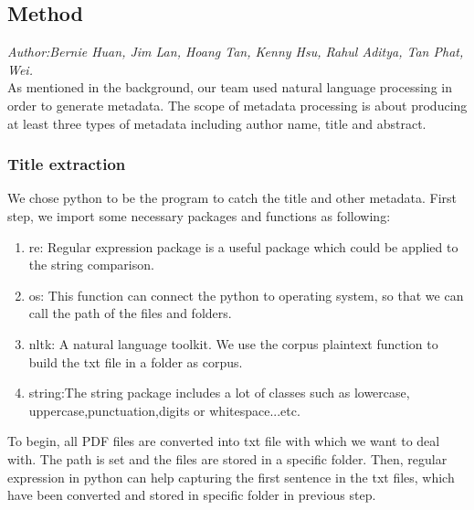 \subsection{Method} %
\textit{\footnotesize Author:Bernie Huan, Jim Lan, Hoang Tan, Kenny Hsu, Rahul Aditya, Tan Phat, Wei.}\\

As mentioned in the background, our team used natural language processing in order to generate metadata. 
The scope of metadata processing is about producing at least three types of metadata including author name, title and abstract.


\subsubsection{Title extraction}

We chose python to be the program to catch the title and other metadata.
First step, we import some necessary packages and functions as following:

\begin{enumerate}
	
	\item re: Regular expression package is a useful package which could be applied to the string comparison.
	\item os: This function can connect the python to operating system, so that we can call the path of the files and folders.
	\item nltk: A natural language toolkit.	We use the corpus plaintext function to build the txt file in a folder as corpus.
	\item string:The string package includes a lot of classes such as lowercase, uppercase,punctuation,digits or whitespace...etc.
	
\end{enumerate}  

To begin, all PDF files are converted into txt file with which we want to deal with.
The path is set and the files are stored in a specific folder.
Then, regular expression in python can help capturing the first sentence in the txt files, which have been converted and stored in specific folder in previous step.


